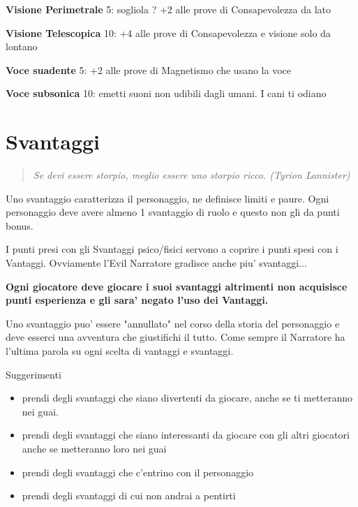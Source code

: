 \documentclass[a4paper,11pt,twoside,openany]{book}
\begin{document}
{\textbf{Visione Perimetrale} 5: sogliola ? +2 alle prove di Consapevolezza da lato

\textbf{Visione Telescopica} 10: +4 alle prove di Consapevolezza e visione solo da lontano

\textbf{Voce suadente} 5: +2 alle prove di Magnetismo che usano la voce

\textbf{Voce subsonica} 10: emetti suoni non udibili dagli umani. I cani ti odiano

\pagebreak

\section{Svantaggi}

\label{svantaggi}
\begin{quote}\textit{
Se devi essere storpio, meglio essere uno storpio ricco. (Tyrion Lannister)}\end{quote}

Uno svantaggio caratterizza il personaggio, ne definisce limiti e paure. Ogni personaggio deve avere almeno 1 svantaggio di ruolo e questo non gli da punti bonus.

I punti presi con gli Svantaggi psico/fisici servono a coprire i punti spesi con i Vantaggi. Ovviamente l'Evil Narratore gradisce anche piu' svantaggi...

\textbf{Ogni giocatore deve giocare i suoi svantaggi altrimenti non acquisisce punti esperienza e gli sara' negato l'uso dei Vantaggi.}

Uno svantaggio puo' essere "annullato" nel corso della storia del personaggio e deve esserci una avventura che giustifichi il tutto. Come sempre il Narratore ha l'ultima parola su ogni scelta di vantaggi e svantaggi.

\bigskip

Suggerimenti
\begin{itemize}
\item 
prendi degli svantaggi che siano divertenti da giocare, anche se ti metteranno nei guai. 
\item 
prendi degli svantaggi che siano interessanti da giocare con gli altri giocatori anche se metteranno loro nei guai 
\item 
prendi degli svantaggi che c'entrino con il personaggio 
\item 
prendi degli svantaggi di cui non andrai a pentirti 
\end{itemize}

}
\end{document}
